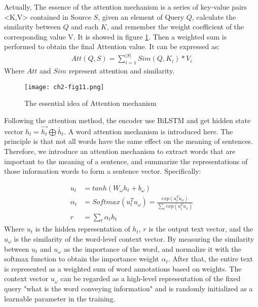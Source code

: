 Actually, The essence of the attention mechanism is a series of key-value pairs <K,V> contained in Source $S$, given an element of Query $Q$, calculate the similarity between $Q$ and each $K$, and remember the weight coefficient of the corresponding value V. It is showed in figure \ref{ch2-fig10}. Then a weighted sum is performed to obtain the final Attention value. It can be expressed as:
\begin{align}
	Att(Q,S) = \sum_{i=1}^{|S|}Sim(Q,K_i)*V_i
\end{align}
Where $Att$ and $Sim$ represent attention and similarity. 

\begin{figure}[h]
	\centering
	\texttt{[image: ch2-fig11.png]}
	\caption{The essential idea of Attention mechanism}
	\label{ch2-fig10}
\end{figure}
Following the attention method, the encoder use BiLSTM and get hidden state vector $h_t=\overrightarrow{h_t}\bigoplus \overleftarrow{h_t}$. A word attention mechanism is introduced here. The principle is that not all words have the same effect on the meaning of sentences. Therefore, we introduce an attention mechanism to extract words that are important to the meaning of a sentence, and summarize the representations of those information words to form a sentence vector.
Specifically:



\begin{align}
	u_t &= tanh(W_\omega h_t + b_\omega ) \\
	\alpha_t&=Softmax(u_t^T u_\omega) = \frac{exp( u_t^T u_\omega)}{\sum_t exp(u_t^T u_\omega)} \\
	r &= \sum_t{\alpha_t h_t}
\end{align}
Where $u_t$ is the hidden representation of $h_t$, $r$ is the output text vector, and the $u_\omega$ is the similarity of the word-level context vector. By measuring the similarity between $u_t$ and $u_\omega$ as the importance of the word, and normalize it with the softmax function to obtain the importance weight $\alpha_{t}$. After that, the entire text is represented as a weighted sum of word annotations based on weights. The context vector $u_\omega$ can be regarded as a high-level representation of the fixed query "what is the word conveying information" and is randomly initialized as a learnable parameter in the training.

